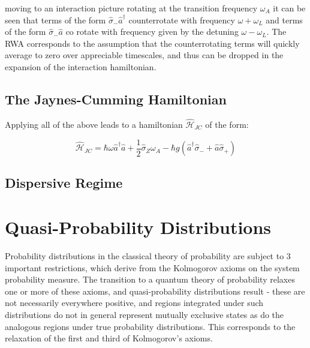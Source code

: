 \documentclass[reqno]{amsart}
\newcommand{\ham}{\hat{\mathscr{H}}}
\newcommand{\cre}{\hat{a}^\dagger}
\newcommand{\ann}{\hat{a}}
\newcommand{\atann}{\hat{\sigma}_-}
\newcommand{\atcre}{\hat{\sigma}_+}
\begin{document}
moving to an interaction picture rotating at the transition frequency $\omega_A$ it can be seen that terms of the form $\atann \cre $ counterrotate with frequency $\omega + \omega_L$ and terms of the form $ \atann \ann$ co rotate with frequency given by the detuning $\omega-\omega_L$. The RWA corresponds to the assumption that the counterrotating terms will quickly average to zero over appreciable timescales, and thus can be dropped in the expansion of the interaction hamiltonian.
\subsection{The Jaynes-Cumming Hamiltonian}
Applying all of the above leads to a hamiltonian $\ham_{JC}$ of the form:

\begin{equation}
	\ham_{JC} = \hbar \omega \cre \hat{a} +\frac{1}{2} \hat{\sigma}_Z \omega_A -\hbar g (\cre \atann + \hat{a} \atcre)
	\label{HJC}
\end{equation}
\subsection{Dispersive Regime}


\section{Quasi-Probability Distributions}

Probability distributions in the classical theory of probability are subject to 3 important restrictions, which derive from the Kolmogorov axioms on the system probability measure. The transition to a quantum theory of probability relaxes one or more of these axioms, and quasi-probability distributions result - these are not necessarily everywhere positive, and regions integrated under such distributions do not in general represent mutually exclusive states as do the analogous regions under true probability distributions. This corresponds to the relaxation of the first and third of Kolmogorov's axioms. 
\end{document}
